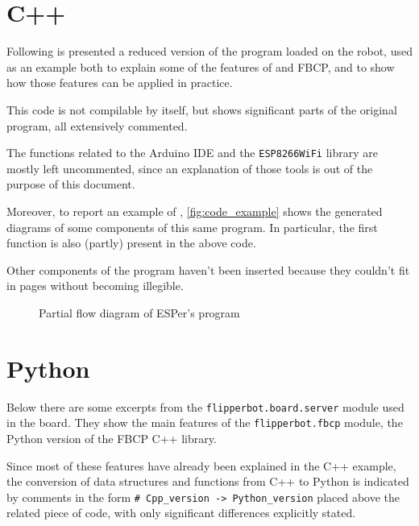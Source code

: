 \section{C++}
Following is presented a reduced version of the program loaded on the robot,
used as an example both to explain some of the features of \ScheMo{} and FBCP,
and to show how those features can be applied in practice.

This code is not compilable by itself, but shows significant parts of the
original program, all extensively commented.

The functions related to the Arduino IDE and the \Verb|ESP8266WiFi| library are
mostly left uncommented, since an explanation of those tools is out of the
purpose of this document.



Moreover, to report an example of \ScheMoTeX{}, \autoref{fig:code_example} shows the
generated diagrams of some components of this same program. In particular,
the first function is also (partly) present in the above code.

Other components of the program haven't been inserted because they couldn't fit
in pages without becoming illegible.

\begin{figure}[hp]
  
  \caption{Partial flow diagram of ESPer's program}
  \label{fig:code_example}
\end{figure}

\section{Python}
Below there are some excerpts from the \Verb|flipperbot.board.server| module
used in the board. They show the main features of the \Verb|flipperbot.fbcp|
module, the Python version of the FBCP C++ library.

Since most of these features have already been explained in the C++ example,
the conversion of data structures and functions from C++ to Python is indicated
by comments in the form \Verb|# Cpp_version -> Python_version| placed above the
related piece of code, with only significant differences explicitly stated.


